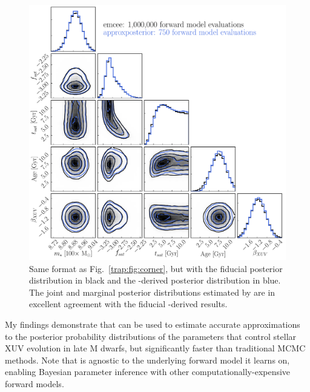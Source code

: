 \begin{figure}
\centering
	\includegraphics[width=\textwidth]{stacked.pdf}
   \caption{Same format as Fig.~\ref{trap:fig:corner}, but with the fiducial posterior distribution in black and the \approxposterior-derived posterior distribution in blue. The joint and marginal posterior distributions estimated by \approxposterior are in excellent agreement with the fiducial \emcee-derived results.}%
    \label{trap:fig:stacked}%
\end{figure}

My findings demonstrate that \approxposterior can be used to estimate accurate approximations to the posterior probability distributions of the parameters that control stellar XUV evolution in late M dwarfs, but significantly faster than traditional MCMC methods. Note that \approxposterior is agnostic to the underlying forward model it learns on, enabling Bayesian parameter inference with other computationally-expensive forward models.


